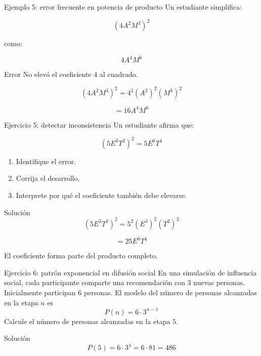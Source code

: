 \documentclass[handout,aspectratio=169]{beamer}
\begin{document}
	\begin{frame}{Ejemplo 5: error frecuente en potencia de producto}
		Un estudiante simplifica:
		
		\[
		(4A^2M^3)^2
		\]
		
		como:
		
		\[
		4A^4M^6
		\]
		
		\begin{alertblock}{Error}
			No elevó el coeficiente \(4\) al cuadrado.
		\end{alertblock}
		
		\[
		(4A^2M^3)^2
		=
		4^2(A^2)^2(M^3)^2
		\]
		
		\[
		=16A^4M^6
		\]
	\end{frame}
	
	\begin{frame}{Ejercicio 5: detectar inconsistencia}
		Un estudiante afirma que:
		
		\[
		(5E^3T^2)^2=5E^6T^4
		\]
		
		\begin{enumerate}
			\item Identifique el error.
			\item Corrija el desarrollo.
			\item Interprete por qué el coeficiente también debe elevarse.
		\end{enumerate}
		
		\pause
		
		\begin{block}{Solución}
			\[
			(5E^3T^2)^2
			=
			5^2(E^3)^2(T^2)^2
			\]
			
			\[
			=25E^6T^4
			\]
			
			El coeficiente forma parte del producto completo.
		\end{block}
	\end{frame}
	
	\begin{frame}{Ejercicio 6: patrón exponencial en difusión social}
		En una simulación de influencia social, cada participante comparte una recomendación con \(3\) nuevas personas. Inicialmente participan \(6\) personas. El modelo del número de personas alcanzadas en la etapa $n$ es 
			\[
		P(n)=6\cdot 3^{n-1}
		\]
	Calcule el número de personas alcanzadas en la etapa \(5\).
					
		\pause
		
		\begin{block}{Solución}
			\[
			P(5)=6\cdot 3^4=6\cdot81=486
			\]
			
		\end{block}
	\end{frame}
	
\end{document}
